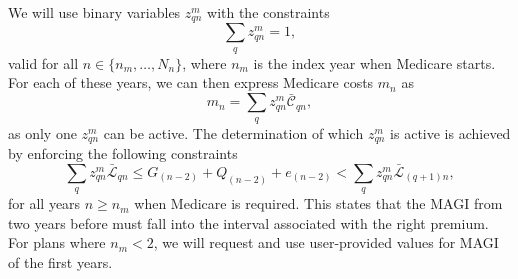 \documentclass{report}[fleqn,11pt]
\begin{document}
	We will use binary variables $z_{qn}^m$ with the constraints
	\begin{equation}
		\label{Eq:SOS1}
		\sum_q z_{qn}^m = 1,
	\end{equation}
	valid  for all $n \in \{n_m, \ldots, N_n\}$, where $n_m$ is the index year when
	Medicare starts.
        For each of these years, we can then express Medicare costs $m_n$ as
	\begin{equation}
		m_n = \sum_q z_{qn}^m \bar{\mathcal{C}}_{qn},
	\end{equation}
	as only one $z_{qn}^m$ can be active.
        The determination of which $z_{qn}^m$ is active is achieved by enforcing the following constraints
	\begin{equation}
		\sum_q z_{qn}^m \bar{\mathcal{L}}_{qn} \le G_{(n-2)} + Q_{(n-2)} + e_{(n-2)}
		   < \sum_q z_{qn}^m \bar{\mathcal{L}}_{(q+1)n},
	\end{equation}
        for all years $n \ge n_m$ when Medicare is required. This states that the MAGI from two years before
	must fall into the interval associated with the right premium. For plans where $n_m<2$, we will request
	and use user-provided values for MAGI of the first years.
\end{document}
